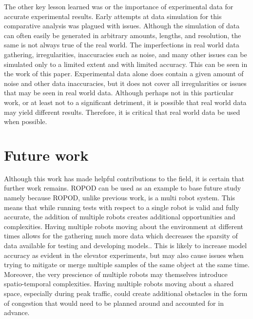    The other key lesson learned was or the importance of experimental
    data for accurate experimental results. Early attempts at data simulation
    for this comparative analysis was plagued with issues. Although
    the simulation of data can often easily be generated in arbitrary amounts,
    lengths, and resolution, the same is not always true of the real world.
    The imperfections in real world data gathering, irregularities,
    inaccuracies such as noise, and many other issues can be simulated
    only to a limited extent and with limited accuracy. This can be seen in the
    work of this paper. Experimental data alone does contain a given amount of noise
    and other data inaccuracies, but it does not cover all irregularities or
    issues that may be seen in real world data. Although perhaps not in this
    particular work, or at least not to a significant detriment, it is possible that
    real world data may yield different results. Therefore, it is critical
    that real world data be used when possible. \\

    \section{ Future work }

    Although this work has made helpful contributions to the field, it is
    certain that further work remains. ROPOD can be used as an example
    to base future study namely because ROPOD, unlike previous work, is a multi robot
    system. This means that while running tests with respect to a single robot
    is valid and fully accurate, the addition of multiple robots creates
    additional opportunities and complexities. Having multiple robots moving about
    the environment at different times allows for the gathering much
    more data which decreases the sparsity of data
    available for testing and developing models.. This is likely to increase model accuracy as evident in the
    elevator experiments, but may also cause issues when trying to mitigate
    or merge multiple samples of the same object at the same time. Moreover,
    the very prescience of multiple robots may themselves introduce spatio-temporal
    complexities. Having multiple robots moving about a shared
    space, especially during peak traffic, could create additional obstacles
    in the form of congestion that would need to be planned around
    and accounted for in advance. \\

